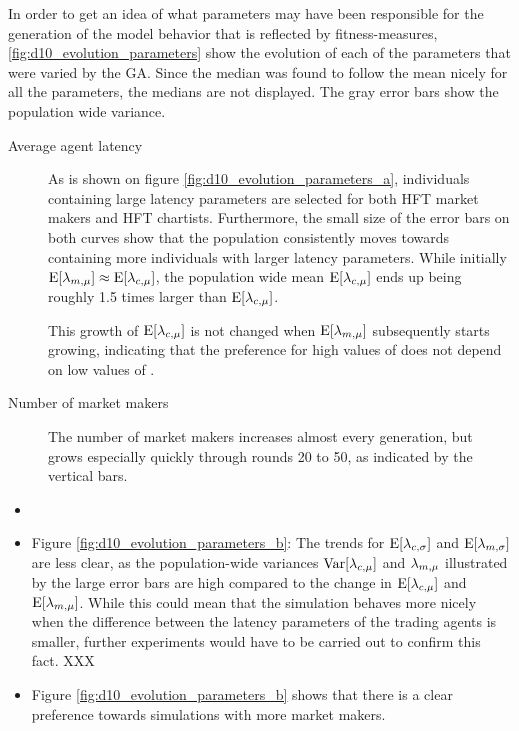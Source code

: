 In order to get an idea of what parameters may have been responsible for the generation of the model behavior that is reflected by fitness-measures, \ref{fig:d10_evolution_parameters} show the evolution of each of the parameters that were varied by the GA. Since the median was found to follow the mean nicely for all the parameters, the medians are not displayed. The gray error bars show the population wide variance.

\begin{description}

\item[Average agent latency]  As is shown on figure \ref{fig:d10_evolution_parameters_a}, individuals containing large latency parameters are selected for both HFT market makers and HFT chartists. Furthermore, the small size of the error bars on both curves show that the population consistently moves towards containing more individuals with larger latency parameters. While initially $\mathrm{E}[\lambda_{m, \mu}] \approx \mathrm{E}[\lambda_{c, \mu}]$, the population wide mean $\mathrm{E}[\lambda_{c, \mu}]$ ends up being roughly 1.5 times larger than $\mathrm{E}[\lambda_{c, \mu}]$. 

This growth of $\mathrm{E}[\lambda_{c, \mu}]$ is not changed when $\mathrm{E}[\lambda_{m, \mu}]$ subsequently starts growing, indicating that the preference for high values of \sclatencymu{} does not depend on low values of \ssmmlatencymu.

\item[Number of market makers] The number of market makers increases almost every generation, but grows especially quickly through rounds 20 to 50, as indicated by the vertical bars.
\end{description}

\begin{itemize}
\item 
\item  Figure \ref{fig:d10_evolution_parameters_b}: The trends for $\mathrm{E}[\lambda_{c, \sigma}]$ and $\mathrm{E}[\lambda_{m, \sigma}]$ are less clear, as the population-wide variances $\mathrm{Var}[\lambda_{c, \mu}]$ and $\lambda_{m, \mu}$ illustrated by the large error bars are high compared to the change in $\mathrm{E}[\lambda_{c, \mu}]$ and $\mathrm{E}[\lambda_{m, \mu}]$. While this could mean that the simulation behaves more nicely when the difference between the latency parameters of the trading agents is smaller, further experiments would have to be carried out to confirm this fact. XXX
\item  Figure \ref{fig:d10_evolution_parameters_b} shows that there is a clear preference towards simulations with more market makers. 
\end{itemize}



